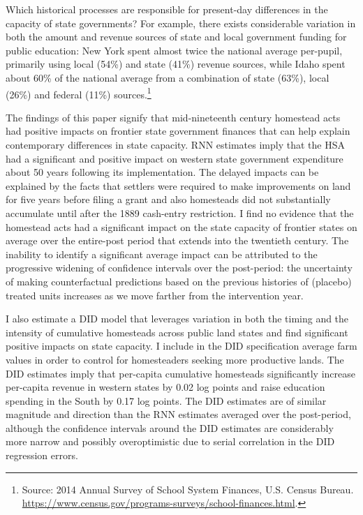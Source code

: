 \documentclass[12pt]{article}
\begin{document}
Which historical processes are responsible for present-day differences in the capacity of state governments? For example, there exists considerable variation in both the amount and revenue sources of state and local government funding for public education: New York spent almost twice the national average per-pupil, primarily using local (54\%) and state (41\%) revenue sources, while Idaho spent about 60\% of the national average from a combination of state (63\%), local (26\%) and federal (11\%) sources.\footnote{Source: 2014 Annual Survey of School System Finances, U.S. Census Bureau. \url{https://www.census.gov/programs-surveys/school-finances.html}.}

The findings of this paper signify that mid-nineteenth century homestead acts had positive impacts on frontier state government finances that can help explain contemporary differences in state capacity. RNN estimates imply that the HSA had a significant and positive impact on western state government expenditure about 50 years following its implementation. The delayed impacts can be explained by the facts that settlers were required to make improvements on land for five years before filing a grant and also homesteads did not substantially accumulate until after the 1889 cash-entry restriction. I find no evidence that the homestead acts had a significant impact on the state capacity of frontier states on average over the entire-post period that extends into the twentieth century. The inability to identify a significant average impact can be attributed to the progressive widening of confidence intervals over the post-period: the uncertainty of making counterfactual predictions based on the previous histories of (placebo) treated units increases as we move farther from the intervention year. 

I also estimate a DID model that leverages variation in both the timing and the intensity of cumulative homesteads across public land states and find significant positive impacts on state capacity. I include in the DID specification average farm values in order to control for homesteaders seeking more productive lands. The DID estimates imply that per-capita cumulative homesteads significantly increase per-capita revenue in western states by 0.02 log points and raise education spending in the South by 0.17 log points. The DID estimates are of similar magnitude and direction than the RNN estimates averaged over the post-period, although the confidence intervals around the DID estimates are considerably more narrow and possibly overoptimistic due to serial correlation in the DID regression errors.
\end{document}
